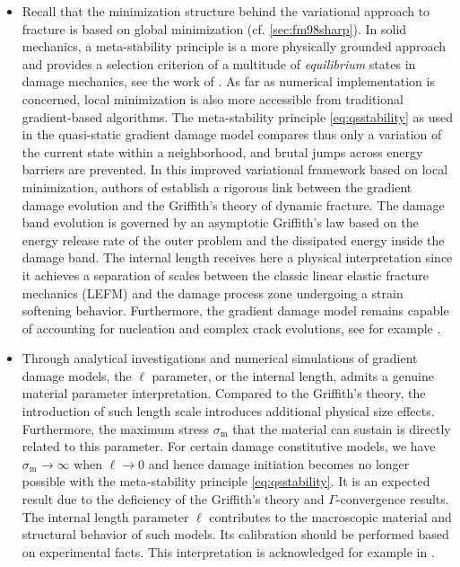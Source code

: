 \begin{itemize}
\item Recall that the minimization structure behind the variational approach to fracture is based on global minimization (cf. \cref{sec:fm98sharp}). In solid mechanics, a meta-stability principle is a more physically grounded approach and provides a selection criterion of a multitude of \emph{equilibrium} states in damage mechanics, see the work of \cite{Nguyen:2000,BenallalMarigo:2007}. As far as numerical implementation is concerned, local minimization is also more accessible from traditional gradient-based algorithms. The meta-stability principle \eqref{eq:qsstability} as used in the quasi-static gradient damage model compares thus only a variation of the current state within a neighborhood, and brutal jumps across energy barriers are prevented. In this improved variational framework based on local minimization, authors of \cite{SicsicMarigo:2013} establish a rigorous link between the gradient damage evolution and the Griffith's theory of dynamic fracture. The damage band evolution is governed by an asymptotic Griffith's law based on the energy release rate of the outer problem and the dissipated energy inside the damage band. The internal length receives here a physical interpretation since it achieves a separation of scales between the classic linear elastic fracture mechanics (LEFM) and the damage process zone undergoing a strain softening behavior. Furthermore, the gradient damage model remains capable of accounting for nucleation and complex crack evolutions, see for example \cite{MauriniBourdinGauthierLazarus:2013,SicsicMarigoMaurini:2013,MesgarnejadBourdinKhonsari:2013,BourdinMarigoMauriniSicsic:2014,Baldelli:2014}.

\item Through analytical investigations \cite{PhamMarigoMaurini:2011,PhamMarigo:2013} and numerical simulations \cite{AmorMarigoMaurini:2009,PhamAmorMarigoMaurini:2011} of gradient damage models, the $\ell$ parameter, or the internal length, admits a genuine material parameter interpretation. Compared to the Griffith's theory, the introduction of such length scale introduces additional physical size effects. Furthermore, the maximum stress $\sigma_\mathrm{m}$ that the material can sustain is directly related to this parameter. For certain damage constitutive models, we have $\sigma_\mathrm{m}\to\infty$ when $\ell\to 0$ and hence damage initiation becomes no longer possible with the meta-stability principle \eqref{eq:qsstability}. It is an expected result due to the deficiency of the Griffith's theory and $\Gamma$-convergence results. The internal length parameter $\ell$ contributes to the macroscopic material and structural behavior of such models. Its calibration should be performed based on experimental facts. This interpretation is acknowledged for example in \cite{LancioniRoyer-Carfagni:2009,FreddiRoyer-Carfagni:2010,PhamAmorMarigoMaurini:2011}.
\end{itemize}

